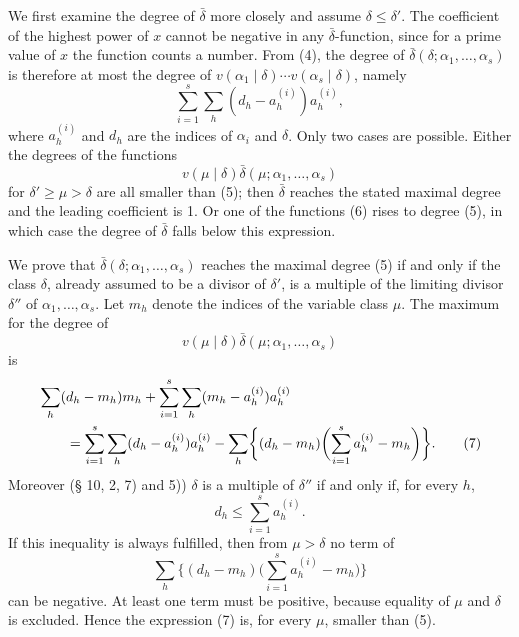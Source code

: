 We first examine the degree of $\bar\delta$ more closely and assume $\delta\le\delta'$. The coefficient of the highest power of $x$ cannot be negative in any $\bar\delta$-function, since for a prime value of $x$ the function counts a number. From (4), the degree of $\bar\delta(\delta;\alpha_1,\ldots,
\alpha_s)$ is therefore at most the degree of $v(\alpha_1\mid\delta)\cdots v(\alpha_s\mid\delta)$, namely
\begin{equation}
 \sum_{i=1}^s\sum_h(d_h-a_h^{(i)})a_h^{(i)},
\tag{5}
\end{equation}
where $a_h^{(i)}$ and $d_h$ are the indices of $\alpha_i$ and $\delta$. Only two cases are possible. Either the degrees of the functions
\begin{equation}
 v(\mu\mid\delta)\bar\delta(\mu;\alpha_1,\ldots,\alpha_s)
\tag{6}
\end{equation}
for $\delta'\ge\mu>\delta$ are all smaller than (5); then $\bar\delta$ reaches the stated maximal degree and the leading coefficient is 1. Or one of the functions (6) rises to degree (5), in which case the degree of $\bar\delta$ falls below this expression.

We prove that $\bar\delta(\delta;\alpha_1,\ldots,
\alpha_s)$ reaches the maximal degree (5) if and only if the class $\delta$, already assumed to be a divisor of $\delta'$, is a multiple of the limiting divisor $\delta''$ of $\alpha_1,
\ldots,
\alpha_s$. Let $m_h$ denote the indices of the variable class $\mu$. The maximum for the degree of
\[
 v(\mu\mid\delta)\bar\delta(\mu;\alpha_1,\ldots,\alpha_s)
\]
is
\begin{align}
&\sum_h(d_h-m_h)m_h+\sum_{i=1}^s\sum_h(m_h-a_h^{(i)})a_h^{(i)} \notag\\
&\qquad =\sum_{i=1}^s\sum_h(d_h-a_h^{(i)})a_h^{(i)}
 -\sum_h\biggl\{(d_h-m_h)\biggl(\sum_{i=1}^s a_h^{(i)}-m_h\biggr)\biggr\}.
\tag{7}
\end{align}
Moreover (§ 10, 2, 7) and 5)) $\delta$ is a multiple of $\delta''$ if and only if, for every $h$,
\begin{equation}
 d_h\le\sum_{i=1}^s a_h^{(i)}.
\tag{8}
\end{equation}
If this inequality is always fulfilled, then from $\mu>\delta$ no term of
\begin{equation}
 \sum_h\biggl\{(d_h-m_h)\biggl(\sum_{i=1}^s a_h^{(i)}-m_h\biggr)\biggr\}
\tag{9}
\end{equation}
can be negative. At least one term must be positive, because equality of $\mu$ and $\delta$ is excluded. Hence the expression (7) is, for every $\mu$, smaller than (5).

